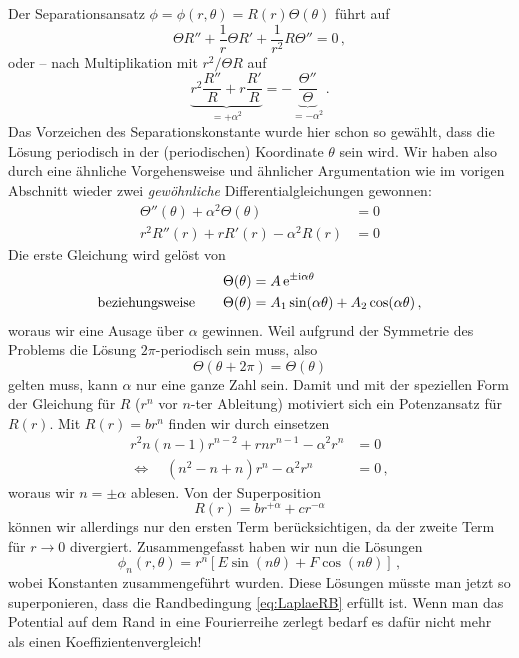 \documentclass[paper=a4, fontsize=11.0pt, abstractoff, DIV12]{scrartcl}
\begin{document}
Der Separationsansatz $\phi = \phi(r,\theta) = R(r)\Theta(\theta)$ führt auf
\begin{equation}
\Theta R'' + \frac{1}{r}\Theta R' + \frac{1}{r^2} R\Theta'' = 0\, ,
\end{equation}
oder -- nach Multiplikation mit $r^2/\Theta R$ auf
\begin{equation}
\underbrace{r^2 \frac{R''}{R} + r\frac{R'}{R}}_{=+\alpha^2} = - \underbrace{\frac{\Theta''}{\Theta}}_{=-\alpha^2}\,.
\end{equation}
Das Vorzeichen des Separationskonstante wurde hier schon so gewählt, dass
die Lösung periodisch in der (periodischen) Koordinate $\theta$ sein wird.
Wir haben also durch eine ähnliche Vorgehensweise und ähnlicher
Argumentation wie im vorigen Abschnitt wieder zwei \emph{gewöhnliche}
Differentialgleichungen gewonnen:
\begin{align}
\Theta''(\theta) + \alpha^2 \Theta(\theta) &= 0\\
r^2 R''(r) + r R'(r) - \alpha^2 R(r) &= 0
\end{align}
Die erste Gleichung wird gelöst von
\begin{align}
\Theta(\theta) &= A\,{\mathrm{e}}^{\pm \mathrm{i} \alpha \theta}\nonumber\\
\text{beziehungsweise}\qquad \Theta(\theta) &= A_1\sin(\alpha \theta) + A_2\cos(\alpha\theta)\,,
\end{align}
woraus wir eine Ausage über $\alpha$ gewinnen. Weil aufgrund der
Symmetrie des Problems die Lösung $2\pi$-periodisch sein muss, also
\begin{equation}
\Theta(\theta + 2\pi) = \Theta(\theta)
\end{equation}
gelten muss, kann $\alpha$ nur eine ganze Zahl sein. Damit und mit der
speziellen Form der Gleichung für $R$ ($r^n$ vor $n$-ter Ableitung)
motiviert sich ein Potenzansatz für $R(r)$. Mit $R(r) = br^n$ finden wir durch
einsetzen
\begin{align}
r^2 n(n-1)r^{n-2} + r n r^{n-1} - \alpha^2 r^n &= 0\nonumber\\
\Leftrightarrow\quad (n^2 -n +n)r^n - \alpha^2 r^n &= 0\,,
\end{align}
woraus wir $n=\pm\alpha$ ablesen. Von der Superposition
\begin{equation}
R(r) = br^{+\alpha} + cr^{-\alpha}
\end{equation}
können wir allerdings nur den ersten Term berücksichtigen, da der zweite Term
für $r\to0$ divergiert. Zusammengefasst haben wir nun die Lösungen
\begin{equation}
\phi_n(r, \theta) = r^n\left[E\sin(n\theta) + F\cos(n\theta)\right]\,,
\end{equation}
wobei Konstanten zusammengeführt wurden. Diese Lösungen müsste man jetzt so
superponieren, dass die Randbedingung \eqref{eq:LaplaeRB} erfüllt ist. Wenn
man das Potential auf dem Rand in eine Fourierreihe zerlegt bedarf es dafür
nicht mehr als einen Koeffizientenvergleich!
\end{document}
